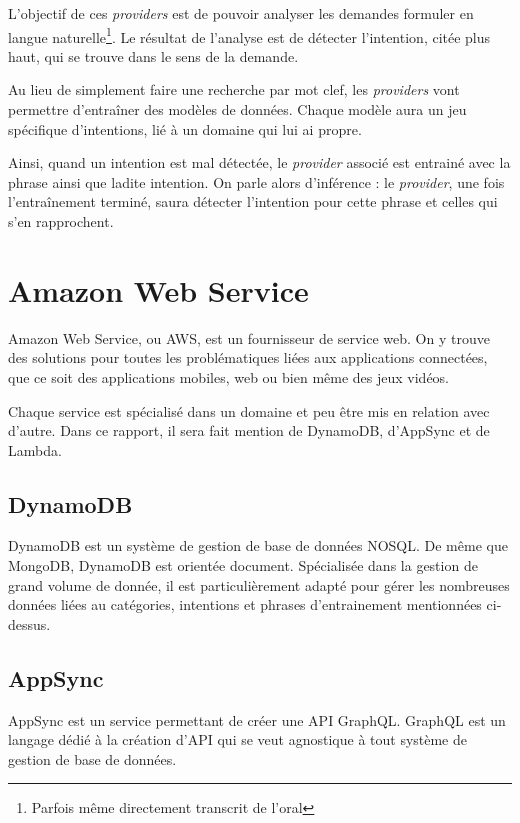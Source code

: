 \documentclass[12pt,a4paper,oneside]{scrreprt}
\begin{document}
L'objectif de ces \textit{providers} est de pouvoir analyser les demandes formuler en langue naturelle\footnote{Parfois même directement transcrit de l'oral}. Le résultat de l'analyse est de détecter l'intention, citée plus haut, qui se trouve dans le sens de la demande.

Au lieu de simplement faire une recherche par mot clef, les \textit{providers} vont permettre d'entraîner des modèles de données. Chaque modèle aura un jeu spécifique d'intentions, lié à un domaine qui lui ai propre.

Ainsi, quand un intention est mal détectée, le \textit{provider} associé est entrainé avec la phrase ainsi que ladite intention. On parle alors d'inférence : le \textit{provider}, une fois l'entraînement terminé, saura détecter l'intention pour cette phrase et celles qui s'en rapprochent.

\section{Amazon Web Service}

Amazon Web Service, ou AWS, est un fournisseur de service web. On y trouve des solutions pour toutes les problématiques liées aux applications connectées, que ce soit des applications mobiles, web ou bien même des jeux vidéos.

Chaque service est spécialisé dans un domaine et peu être mis en relation avec d'autre. Dans ce rapport, il sera fait mention de DynamoDB, d'AppSync et de Lambda.

\subsection*{DynamoDB}

DynamoDB est un système de gestion de base de données NOSQL. De même que MongoDB, DynamoDB est orientée document. Spécialisée dans la gestion de grand volume de donnée, il est particulièrement adapté pour gérer les nombreuses données liées au catégories, intentions et phrases d'entrainement mentionnées ci-dessus.

\subsection*{AppSync}

AppSync est un service permettant de créer une API GraphQL. GraphQL est un langage dédié à la création d'API qui se veut agnostique à tout système de gestion de base de données.
\end{document}
